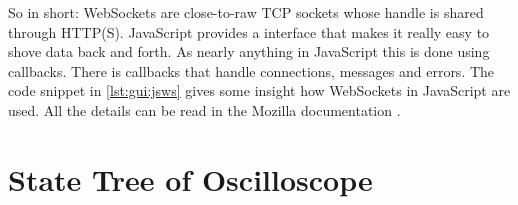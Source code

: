 So in  short: WebSockets are close-to-raw  TCP sockets whose handle  is shared
through HTTP(S).
JavaScript provides a  interface that makes it really easy  to shove data back
and forth.
As  nearly anything  in  JavaScript  this is  done  using callbacks. There  is
callbacks that  handle connections, messages  and errors. The code  snippet in
\ref{lst:gui:jsws}  gives  some  insight  how  WebSockets  in  JavaScript  are
used. All the details can be read in the Mozilla documentation \cite{moz:ws}.

%
%
\section{State Tree of Oscilloscope} %
\label{sec:app:gui:state_tree_of_scope}
%
%
\section{} %
\label{sec:app:gui:mithril}

